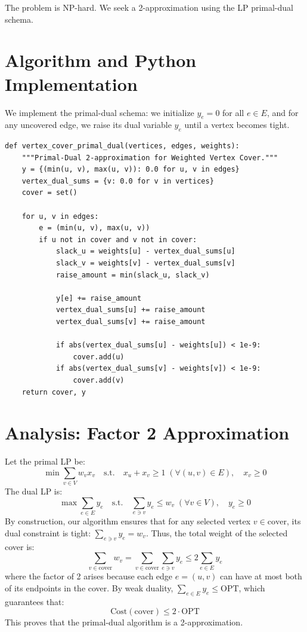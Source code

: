 \documentclass[11pt,oneside]{book}
\begin{document}
The problem is NP-hard. We seek a 2-approximation using the LP primal-dual schema.

\section{Algorithm and Python Implementation}
We implement the primal-dual schema: we initialize $y_e = 0$ for all $e \in E$, and for any uncovered edge, we raise its dual variable $y_e$ until a vertex becomes tight.

\begin{lstlisting}[style=python, caption=Primal-Dual Schema for Weighted Vertex Cover]
def vertex_cover_primal_dual(vertices, edges, weights):
    """Primal-Dual 2-approximation for Weighted Vertex Cover."""
    y = {(min(u, v), max(u, v)): 0.0 for u, v in edges}
    vertex_dual_sums = {v: 0.0 for v in vertices}
    cover = set()
    
    for u, v in edges:
        e = (min(u, v), max(u, v))
        if u not in cover and v not in cover:
            slack_u = weights[u] - vertex_dual_sums[u]
            slack_v = weights[v] - vertex_dual_sums[v]
            raise_amount = min(slack_u, slack_v)
            
            y[e] += raise_amount
            vertex_dual_sums[u] += raise_amount
            vertex_dual_sums[v] += raise_amount
            
            if abs(vertex_dual_sums[u] - weights[u]) < 1e-9:
                cover.add(u)
            if abs(vertex_dual_sums[v] - weights[v]) < 1e-9:
                cover.add(v)
    return cover, y
\end{lstlisting}

\section{Analysis: Factor 2 Approximation}
Let the primal LP be:
\[
\min \sum_{v \in V} w_v x_v \quad \text{s.t.} \quad x_u + x_v \ge 1 \; (\forall (u,v) \in E), \quad x_v \ge 0
\]
The dual LP is:
\[
\max \sum_{e \in E} y_e \quad \text{s.t.} \quad \sum_{e \ni v} y_e \le w_v \; (\forall v \in V), \quad y_e \ge 0
\]
By construction, our algorithm ensures that for any selected vertex $v \in \text{cover}$, its dual constraint is tight: $\sum_{e \ni v} y_e = w_v$.
Thus, the total weight of the selected cover is:
\[
\sum_{v \in \text{cover}} w_v = \sum_{v \in \text{cover}} \sum_{e \ni v} y_e \le 2 \sum_{e \in E} y_e
\]
where the factor of 2 arises because each edge $e = (u,v)$ can have at most both of its endpoints in the cover. By weak duality, $\sum_{e \in E} y_e \le \text{OPT}$, which guarantees that:
\[
\text{Cost}(\text{cover}) \le 2 \cdot \text{OPT}
\]
This proves that the primal-dual algorithm is a 2-approximation.
\end{document}
